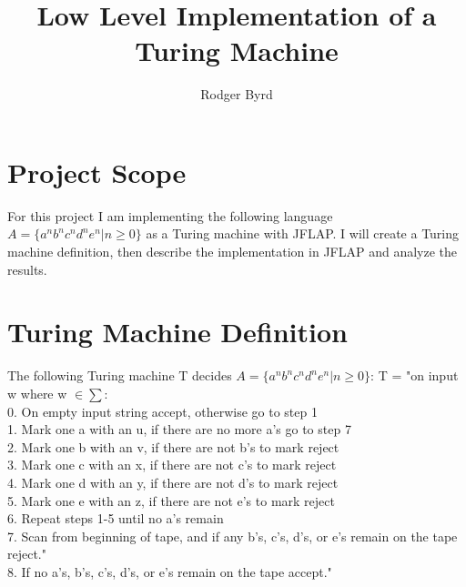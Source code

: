 \documentclass{article}
\begin{document}
\raggedright
\doublespacing

\title{Low Level Implementation of a Turing Machine}
\author{Rodger Byrd}
\maketitle
\section{Project Scope}
For this project I am implementing the following language $A=\{a^{n}b^{n}c^{n}d^{n}e^{n} \vert n \geq 0\}$ as a Turing machine with JFLAP\cite{jflap}. I will create a Turing machine definition, then describe the implementation in JFLAP and analyze the results.

\section{Turing Machine Definition}
The following Turing machine T decides $A=\{a^{n}b^{n}c^{n}d^{n}e^{n} \vert n \geq 0\}$:\break
T = "on input w where w $ \in \sum$:\\
\hspace{20 pt} 0. On empty input string accept, otherwise go to step 1\\
\hspace{20 pt} 1. Mark one a with an u, if there are no more a's go to step 7\\
\hspace{20 pt} 2. Mark one b with an v, if there are not b's to mark reject\\
\hspace{20 pt} 3. Mark one c with an x, if there are not c's to mark reject\\
\hspace{20 pt} 4. Mark one d with an y, if there are not d's to mark reject\\
\hspace{20 pt} 5. Mark one e with an z, if there are not e's to mark reject\\
\hspace{20 pt} 6. Repeat steps 1-5 until no a's remain\\
\hspace{20 pt} 7. Scan from beginning of tape, and if any b's, c's, d's, or e's remain on the tape reject."\\
\hspace{20 pt} 8. If no a's, b's, c's, d's, or e's remain on the tape accept."
\end{document}
